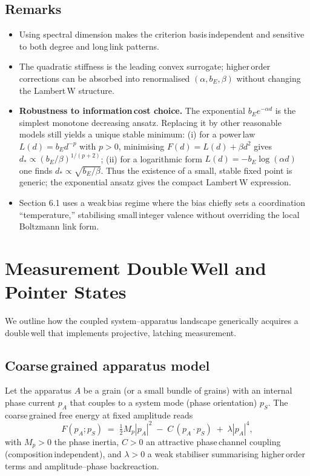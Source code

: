 \documentclass[11pt]{article}
\begin{document}
\subsection{Remarks}

\begin{itemize}
\item Using spectral dimension makes the criterion basis\,independent and sensitive to both degree and long\,link patterns.
\item The quadratic stiffness is the leading convex surrogate; higher\,order corrections can be absorbed into renormalised $(\alpha, b_E, \beta)$ without changing the Lambert\,W structure.
\item \textbf{Robustness to information\,cost choice.} The exponential $b_E e^{-\alpha d}$ is the simplest monotone decreasing ansatz. Replacing it by other reasonable models still yields a unique stable minimum: (i) for a power\,law $L(d)=b_E d^{-p}$ with $p>0$, minimising $F(d)=L(d)+\beta d^2$ gives $d_*\propto (b_E/\beta)^{1/(p+2)}$; (ii) for a logarithmic form $L(d)=-b_E\log(\alpha d)$ one finds $d_*\propto\sqrt{b_E/\beta}$. Thus the existence of a small, stable fixed point is generic; the exponential ansatz gives the compact Lambert\,W expression.
\item Section 6.1 uses a weak\,bias regime where the bias chiefly sets a coordination ``temperature,'' stabilising small\,integer valence without overriding the local Boltzmann link form.
\end{itemize}

\section{Measurement Double\,Well and Pointer States}\label{si:measure-dw}
We outline how the coupled system–apparatus landscape generically acquires a double\,well that implements projective, latching measurement.

\subsection*{Coarse\,grained apparatus model}
Let the apparatus $A$ be a grain (or a small bundle of grains) with an internal phase current $p_A$ that couples to a system mode (phase orientation) $p_S$. The coarse\,grained free energy at fixed amplitude reads
\begin{equation}
  F(p_A;p_S) \;=\; \tfrac12 M_p |p_A|^2 \; -\; C\,(p_A\!\cdot\!p_S) \; +\; \lambda |p_A|^4,
\end{equation}
with $M_p>0$ the phase inertia, $C>0$ an attractive phase\,channel coupling (composition\,independent), and $\lambda>0$ a weak stabiliser summarising higher\,order terms and amplitude–phase backreaction.
\end{document}
